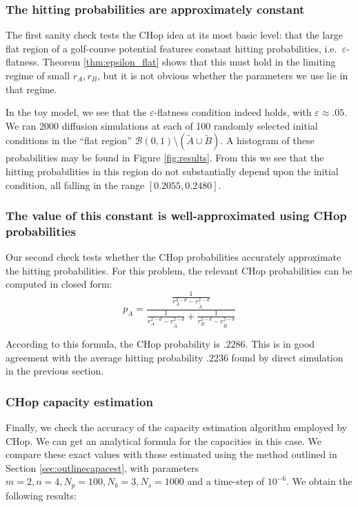 \documentclass[english, aip, jcp, priprint, graphicx,floatfix]{revtex4-1}
\theoremstyle{plain}
\theoremstyle{definition}
\theoremstyle{plain}
\begin{document}
\subsubsection{The hitting probabilities are approximately constant}

The first sanity check tests the CHop idea at its most basic level: that the large flat region of a golf-course potential features constant hitting probabilities, i.e.\ $\varepsilon$-flatness.  Theorem \ref{thm:epsilon_flat} shows that this must hold in the limiting regime of small $r_A,r_B$, but it is not obvious whether the parameters we use lie in that regime.  

In the toy model, we see that the $\varepsilon$-flatness condition indeed holds, with $\varepsilon \approx .05$.  We ran 2000 diffusion simulations at each of 100 randomly selected initial conditions in the ``flat region'' $\mathcal{B}(0, 1) \setminus (\tilde{A} \cup \tilde{B})$.  A histogram of these probabilities may be found in Figure \ref{fig:results}.  From this we see that the hitting probabilities in this region do not substantially depend upon the initial condition, all falling in the range $[0.2055, 0.2480]$.


\subsubsection{The value of this constant is well-approximated using CHop probabilities}

Our second check tests whether the CHop probabilities accurately approximate the hitting probabilities.  For this problem, the relevant CHop probabilities can be computed in closed form:
\begin{equation}
p_A = \frac{\frac{1}{r_A^{2 - d} - r_{\tilde{A}}^{2 - d}}}{\frac{1}{r_A^{2 - d} - r_{\tilde{A}}^{2 - d}} + \frac{1}{r_B^{2 - d} - r_{\tilde{B}}^{2 - d}}}
\end{equation}

According to this formula, the CHop probability is $.2286$.  This is in good agreement with the average hitting probability $.2236$ found by direct simulation in the previous section.


\subsubsection{CHop capacity estimation}

Finally, we check the accuracy of the capacity estimation algorithm employed by CHop.  We can get an analytical formula for the capacities in this case.  We compare these exact values with those estimated using the method outlined in Section \ref{sec:outlinecapacest}, with parameters $m = 2, n = 4, N_p = 100, N_b = 3,N_s = 1000$ and a time-step of $10^{-6}$.  We obtain the following results:
\end{document}
